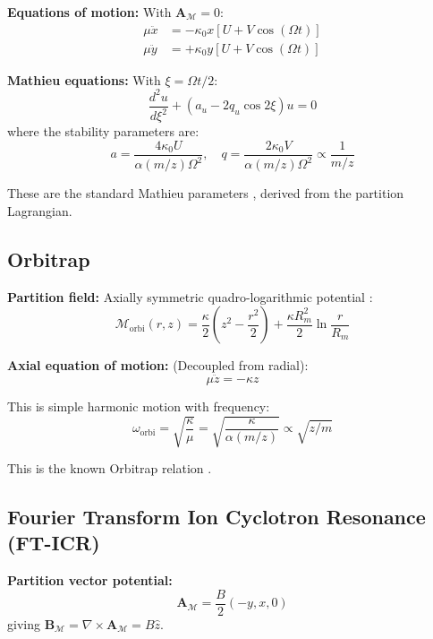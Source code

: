 \documentclass[twocolumn,10pt,a4paper]{article}
\theoremstyle{definition}
\theoremstyle{remark}
\newcommand{\Depth}{\mathcal{M}}
\newcommand{\Apartition}{\mathbf{A}_{\mathcal{M}}}
\newcommand{\partinert}{\mu}
\begin{document}
\textbf{Equations of motion:} With $\Apartition = 0$:
\begin{align}
    \partinert\ddot{x} &= -\kappa_0 x[U + V\cos(\Omega t)] \\
    \partinert\ddot{y} &= +\kappa_0 y[U + V\cos(\Omega t)]
\end{align}

\textbf{Mathieu equations:} With $\xi = \Omega t/2$:
\begin{equation}
    \frac{d^2u}{d\xi^2} + (a_u - 2q_u\cos 2\xi)u = 0
\end{equation}
where the stability parameters are:
\begin{equation}
    \boxed{a = \frac{4\kappa_0 U}{\alpha(m/z)\Omega^2}, \quad q = \frac{2\kappa_0 V}{\alpha(m/z)\Omega^2} \propto \frac{1}{m/z}}
\end{equation}

These are the standard Mathieu parameters \citep{paul1990,march2005}, derived from the partition Lagrangian.

\subsection{Orbitrap}

\textbf{Partition field:} Axially symmetric quadro-logarithmic potential \citep{makarov2000}:
\begin{equation}
    \Depth_{\text{orbi}}(r, z) = \frac{\kappa}{2}\left(z^2 - \frac{r^2}{2}\right) + \frac{\kappa R_m^2}{2}\ln\frac{r}{R_m}
\end{equation}

\textbf{Axial equation of motion:} (Decoupled from radial):
\begin{equation}
    \partinert\ddot{z} = -\kappa z
\end{equation}

This is simple harmonic motion with frequency:
\begin{equation}
    \boxed{\omega_{\text{orbi}} = \sqrt{\frac{\kappa}{\partinert}} = \sqrt{\frac{\kappa}{\alpha(m/z)}} \propto \sqrt{z/m}}
\end{equation}

This is the known Orbitrap relation \citep{makarov2000}.

\subsection{Fourier Transform Ion Cyclotron Resonance (FT-ICR)}

\textbf{Partition vector potential:}
\begin{equation}
    \Apartition = \frac{B}{2}(-y, x, 0)
\end{equation}
giving $\mathbf{B}_{\Depth} = \nabla \times \Apartition = B\hat{z}$.
\end{document}
